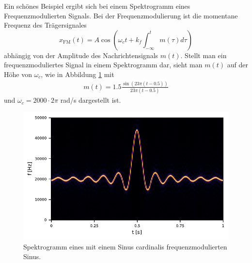 Ein schönes Beispiel ergibt sich bei einem Spektrogramm eines Frequenzmodulierten 
Signals.
Bei der Frequenzmodulierung \cite{sonogramm:NAT} ist die momentane Frequenz des Trägersignales 
\begin{equation}
    x_{\text{FM}}(t) = A \cos\left( \omega_c t + k_f \int_{-\infty}^{t} m(\tau) d\tau\right)
\end{equation}
abhängig von der Amplitude des Nachrichtensignals $m(t)$.
Stellt man ein frequenzmoduliertes Signal in einem Spektrogramm dar,
sieht man $m(t)$ auf der Höhe von $\omega_c$, wie in Abbildung \ref{sonogramm:fmsono} mit 
\begin{align}
    m(t) = 1.5 \frac{\sin(23 \pi (t-0.5))}{23 \pi (t-0.5)}
\end{align}
und $\omega_c =2000\cdot 2\pi$ rad/s dargestellt ist.
\begin{figure}
    \centering
    \includegraphics{papers/sonogramm/images/fm_sono_windows.pdf}
    \caption{Spektrogramm eines mit einem Sinus cardinalis frequenzmodulierten Sinus.
    \label{sonogramm:fmsono}
    }
\end{figure}
